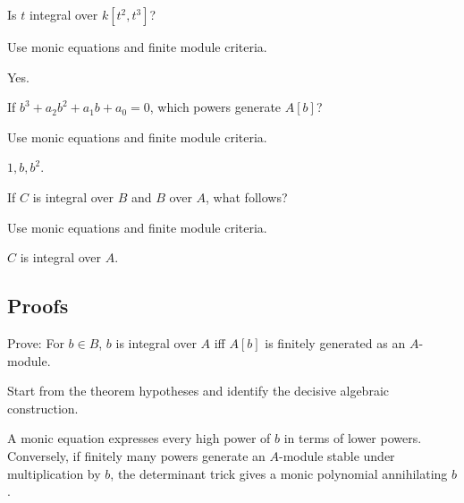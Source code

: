 \begin{exercise}\label{exr:v19-expand-03}
Is $t$ integral over $k[t^2,t^3]$?
\end{exercise}
\begin{hint}
Use monic equations and finite module criteria.
\end{hint}
\begin{solution}
Yes.
\end{solution}

\begin{exercise}\label{exr:v19-expand-04}
If $b^3+a_2b^2+a_1b+a_0=0$, which powers generate $A[b]$?
\end{exercise}
\begin{hint}
Use monic equations and finite module criteria.
\end{hint}
\begin{solution}
$1,b,b^2$.
\end{solution}

\begin{exercise}[Transitivity]\label{exr:v19-expand-05}
If $C$ is integral over $B$ and $B$ over $A$, what follows?
\end{exercise}
\begin{hint}
Use monic equations and finite module criteria.
\end{hint}
\begin{solution}
$C$ is integral over $A$.
\end{solution}

\subsection*{Proofs}

\begin{exercise}\label{exr:v19-expand-06}
Prove: For $b\in B$, $b$ is integral over $A$ iff $A[b]$ is finitely generated as an $A$-module.
\end{exercise}
\begin{hint}
Start from the theorem hypotheses and identify the decisive algebraic construction.
\end{hint}
\begin{solution}
A monic equation expresses every high power of $b$ in terms of lower powers. Conversely, if finitely many powers generate an $A$-module stable under multiplication by $b$, the determinant trick gives a monic polynomial annihilating $b$.
\end{solution}


